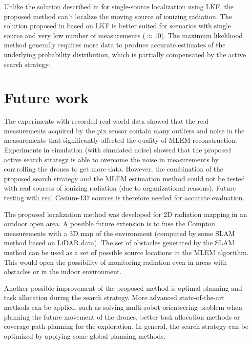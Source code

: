 Unlike the solution described in \cite{baca2021gamma} for single-source localization using \ac{LKF}, the proposed method can't localize the moving source of ionizing radiation.
The solution proposed in \cite{baca2021gamma} based on \ac{LKF} is better suited for scenarios with single source and very low number of measurements ($\approx 10$).
The maximum likelihood method generally requires more data to produce accurate estimates of the underlying probability distribution, which is partially compensated by the active search strategy.

\section{Future work}
The experiments with recorded real-world data showed that the real measurements acquired by the \ac{pix} sensor contain many outliers and noise in the measurements that significantly affected the quality of \ac{MLEM} reconstruction.
Experiments in simulation (with simulated noise) showed that the proposed active search strategy is able to overcome the noise in measurements by controlling the drones to get more data.
However, the combination of the proposed search strategy and the \ac{MLEM} estimation method could not be tested with real sources of ionizing radiation (due to organizational reasons).
Future testing with real Cesium-137 sources is therefore needed for accurate evaluation.

The proposed localization method was developed for 2D radiation mapping in an outdoor open area.
A possible future extension is to fuse the Compton measurements with a 3D map of the environment (computed by some \ac{SLAM} method based on \ac{LiDAR} data).
The set of obstacles generated by the \ac{SLAM} method can be used as a set of possible source locations in the \ac{MLEM} algorithm.
This would open the possibility of monitoring radiation even in areas with obstacles or in the indoor environment.

Another possible improvement of the proposed method is optimal planning and task allocation during the search strategy.
More advanced state-of-the-art methods can be applied, such as solving multi-robot orienteering problem when planning the future movement of the drones, better task allocation methods or coverage path planning for the exploration.
In general, the search strategy can be optimized by applying some global planning methods.













